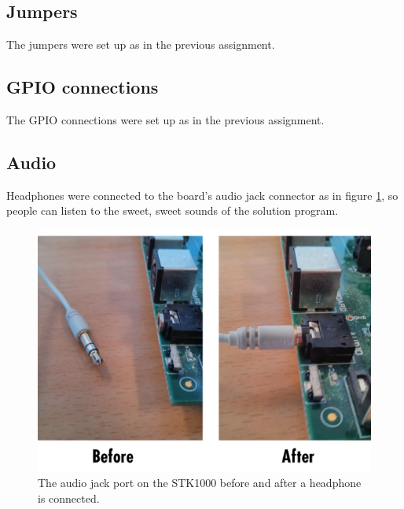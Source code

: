 \subsection{Jumpers}

The jumpers were set up as in the previous assignment.\cite{tdt4258-1}

\subsection{GPIO connections}

The GPIO connections were set up as in the previous assignment.\cite{tdt4258-1}

\subsection{Audio}

Headphones were connected to the board's audio jack connector as in figure \ref{img-audiojack}, so people can listen to the sweet, sweet sounds of the solution program.

\begin{figure}[H]
	\includegraphics[width = \textwidth]{images/audiojack.png}
	\caption{The audio jack port on the STK1000 before and after a headphone is connected.}
	\label{img-audiojack}
\end{figure}